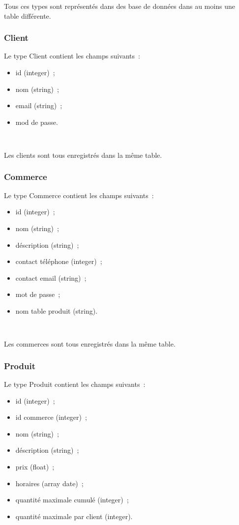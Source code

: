\documentclass[a4paper,12pt]{article}
\begin{document}
Tous ces types sont représentés dans des base de données dans au moins une table différente.

\subsubsection{Client}

Le type Client contient les champs suivants~:
\begin{itemize}
	\item id (integer)~;
	\item nom (string)~;
	\item email (string)~;
	\item mod de passe.
\end{itemize} \

Les clients sont tous enregistrés dans la même table.

\subsubsection{Commerce}

Le type Commerce contient les champs suivants~:
\begin{itemize}
	\item id (integer)~;
	\item nom (string)~;
	\item déscription (string)~;
	\item contact téléphone (integer)~;
	\item contact email (string)~;
	\item mot de passe~;
	\item nom table produit (string).
\end{itemize} \

Les commerces sont tous enregistrés dans la même table.

\subsubsection{Produit}

Le type Produit contient les champs suivants~:
\begin{itemize}
	\item id (integer)~;
	\item id commerce (integer)~;
	\item nom (string)~;
	\item déscription (string)~;
	\item prix (float)~;
	\item horaires (array date)~;
	\item quantité maximale cumulé (integer)~;
	\item quantité maximale par client (integer).
\end{itemize} \
\end{document}
